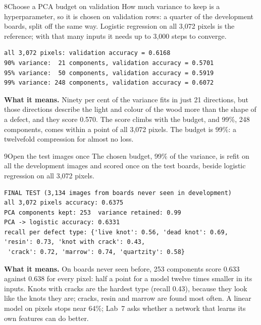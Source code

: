 \begin{labquestion}{8}{Choose a PCA budget on validation}
How much variance to keep is a hyperparameter, so it is chosen on validation rows: a quarter of the development boards, split off the same way. Logistic regression on all 3,072 pixels is the reference; with that many inputs it needs up to 3,000 steps to converge.
\end{labquestion}
\begin{labanswer}

\begin{refoutput}
\begin{lstlisting}[style=utpterminal]
all 3,072 pixels: validation accuracy = 0.6168
90% variance:  21 components, validation accuracy = 0.5701
95% variance:  50 components, validation accuracy = 0.5919
99% variance: 248 components, validation accuracy = 0.6072
\end{lstlisting}
\end{refoutput}

\textbf{What it means.} Ninety per cent of the variance fits in just 21 directions, but those directions describe the light and colour of the wood more than the shape of a defect, and they score 0.570. The score climbs with the budget, and 99\%, 248 components, comes within a point of all 3,072 pixels. The budget is 99\%: a twelvefold compression for almost no loss.
\end{labanswer}

\begin{labquestion}{9}{Open the test images once}
The chosen budget, 99\% of the variance, is refit on all the development images and scored once on the test boards, beside logistic regression on all 3,072 pixels.
\end{labquestion}
\begin{labanswer}

\begin{refoutput}
\begin{lstlisting}[style=utpterminal]
FINAL TEST (3,134 images from boards never seen in development)
all 3,072 pixels accuracy: 0.6375
PCA components kept: 253  variance retained: 0.99
PCA -> logistic accuracy: 0.6331
recall per defect type: {'live knot': 0.56, 'dead knot': 0.69, 'resin': 0.73, 'knot with crack': 0.43,
 'crack': 0.72, 'marrow': 0.74, 'quartzity': 0.58}
\end{lstlisting}
\end{refoutput}

\textbf{What it means.} On boards never seen before, 253 components score 0.633 against 0.638 for every pixel: half a point for a model twelve times smaller in its inputs. Knots with cracks are the hardest type (recall 0.43), because they look like the knots they are; cracks, resin and marrow are found most often. A linear model on pixels stops near 64\%; Lab~7 asks whether a network that learns its own features can do better.
\end{labanswer}

